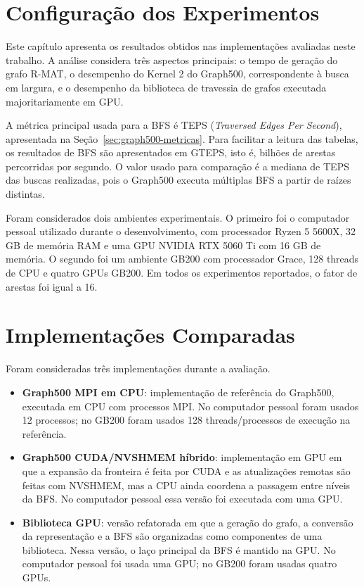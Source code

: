 \section{Configuração dos Experimentos}

Este capítulo apresenta os resultados obtidos nas implementações avaliadas neste
trabalho. A análise considera três aspectos principais: o tempo de geração do
grafo R-MAT, o desempenho do Kernel 2 do Graph500, correspondente à busca em
largura, e o desempenho da biblioteca de travessia de grafos executada
majoritariamente em GPU.

A métrica principal usada para a BFS é TEPS (\textit{Traversed Edges Per
Second}), apresentada na Seção~\ref{sec:graph500-metricas}. Para facilitar a
leitura das tabelas, os resultados de BFS são apresentados em GTEPS, isto é,
bilhões de arestas percorridas por segundo. O valor usado para comparação é a
mediana de TEPS das buscas realizadas, pois o Graph500 executa múltiplas BFS a
partir de raízes distintas.

Foram considerados dois ambientes experimentais. O primeiro foi o computador
pessoal utilizado durante o desenvolvimento, com processador Ryzen 5 5600X, 32 GB
de memória RAM e uma GPU NVIDIA RTX 5060 Ti com 16 GB de memória. O segundo foi
um ambiente GB200 com processador Grace, 128 threads de CPU e quatro GPUs GB200.
Em todos os experimentos reportados, o fator de arestas foi igual a 16.

\section{Implementações Comparadas}

Foram consideradas três implementações durante a avaliação.

\begin{itemize}
\item \textbf{Graph500 MPI em CPU}: implementação de referência do Graph500,
executada em CPU com processos MPI. No computador pessoal foram usados 12
processos; no GB200 foram usados 128 threads/processos de execução na referência.
\item \textbf{Graph500 CUDA/NVSHMEM híbrido}: implementação em GPU em que a
expansão da fronteira é feita por CUDA e as atualizações remotas são feitas com
NVSHMEM, mas a CPU ainda coordena a passagem entre níveis da BFS. No computador
pessoal essa versão foi executada com uma GPU.
\item \textbf{Biblioteca GPU}: versão refatorada em que a geração do grafo, a
conversão da representação e a BFS são organizadas como componentes de uma
biblioteca. Nessa versão, o laço principal da BFS é mantido na GPU. No computador
pessoal foi usada uma GPU; no GB200 foram usadas quatro GPUs.
\end{itemize}

